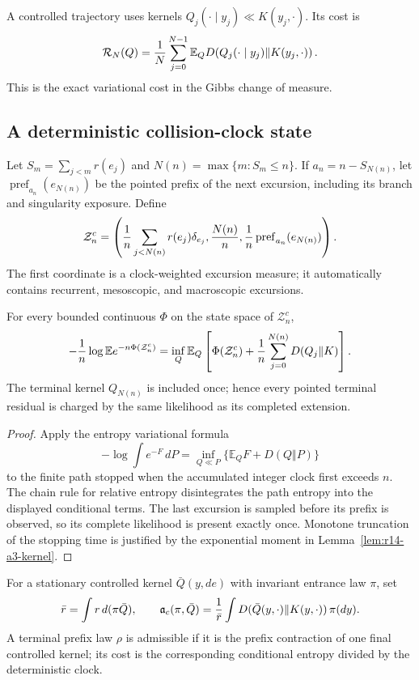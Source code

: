 A controlled trajectory uses kernels \(Q_j(\cdot\mid y_j)\ll K(y_j,\cdot)\).
Its cost is
\[
 \mathcal R_N(Q)
 ={1\over N}\sum_{j=0}^{N-1}
 \mathbb E_Q D\!\left(Q_j(\cdot\mid y_j)\Vert K(y_j,\cdot)\right).
\]
This is the exact variational cost in the Gibbs change of measure.

\subsection{A deterministic collision-clock state}

Let \(S_m=\sum_{j<m}r(e_j)\) and
\(N(n)=\max\{m:S_m\le n\}\).  If \(a_n=n-S_{N(n)}\), let
\(\operatorname{pref}_{a_n}(e_{N(n)})\) be the pointed prefix of the next
excursion, including its branch and singularity exposure.  Define
\[
 \mathcal Z_n^c=
 \left(
 {1\over n}\sum_{j<N(n)}r(e_j)\delta_{e_j},
 {N(n)\over n},
 {1\over n}\operatorname{pref}_{a_n}(e_{N(n)})
 \right).
\]
The first coordinate is a clock-weighted excursion measure; it automatically
contains recurrent, mesoscopic, and macroscopic excursions.

\begin{theorem}
\label{thm:r14-a3-control}
For every bounded continuous \(\Phi\) on the state space of
\(\mathcal Z_n^c\),
\[
 -{1\over n}\log\mathbb E
 e^{-n\Phi(\mathcal Z_n^c)}
 =
 \inf_Q\mathbb E_Q
 \left[
  \Phi(\mathcal Z_n^c)
  +{1\over n}\sum_{j=0}^{N(n)}
   D(Q_j\Vert K)
 \right].
\]
The terminal kernel \(Q_{N(n)}\) is included once; hence every pointed
terminal residual is charged by the same likelihood as its completed
extension.
\end{theorem}

\begin{proof}
Apply the entropy variational formula
\[
 -\log\int e^{-F}\,dP
 =\inf_{Q\ll P}\{\mathbb E_QF+D(Q\Vert P)\}
\]
to the finite path stopped when the accumulated integer clock first exceeds
\(n\).  The chain rule for relative entropy disintegrates the path entropy
into the displayed conditional terms.  The last excursion is sampled before
its prefix is observed, so its complete likelihood is present exactly once.
Monotone truncation of the stopping time is justified by the exponential
moment in Lemma~\ref{lem:r14-a3-kernel}.
\end{proof}

For a stationary controlled kernel \(\bar Q(y,de)\) with invariant entrance
law \(\pi\), set
\[
 \bar r=\int r\,d(\pi\bar Q),\qquad
 \mathfrak a_c(\pi,\bar Q)
 ={1\over\bar r}\int
 D(\bar Q(y,\cdot)\Vert K(y,\cdot))\,\pi(dy).
\]
A terminal prefix law \(\rho\) is admissible if it is the prefix contraction
of one final controlled kernel; its cost is the corresponding conditional
entropy divided by the deterministic clock.

